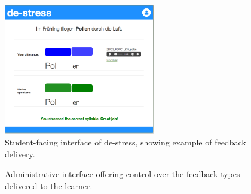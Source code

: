 \documentclass[a4paper]{article}
\newcommand{\TODO}[1]{{\color{red}\textbf{[TODO #1]}}}
\begin{document}
	\begin{figure}[h!]
		\centering
		\includegraphics[height=5.7cm]{../../img/screenshots/StudentInterface-userIcon}
		\caption{Student-facing interface of de-stress, showing example of feedback delivery.}
		\label{fig:interface:student}
	\end{figure}
	
		\begin{figure}[h!]
		\centering
		\caption{Administrative interface offering control over the feedback types delivered to the learner.}
		\label{fig:interface:admin}
	\end{figure}
	
	
%	
%	
%	
	
\end{document}
